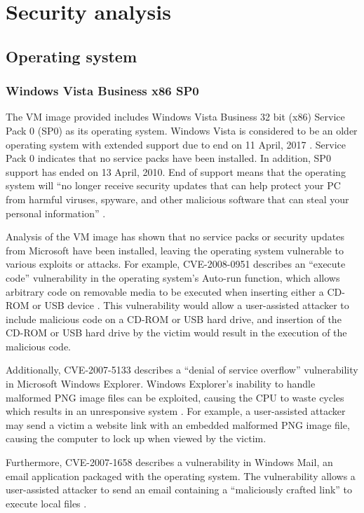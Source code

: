 \section{Security analysis}

\subsection{Operating system}

\subsubsection{Windows Vista Business x86 SP0}

The VM image provided includes Windows Vista Business 32 bit (x86) Service Pack 0 (SP0) as its operating system. Windows Vista is considered to be an older operating system with extended support due to end on 11 April, 2017 \citep{Microsoft2014}. Service Pack 0 indicates that no service packs have been installed. In addition, SP0 support has ended on 13 April, 2010. End of support means that the operating system will ``no longer receive security updates that can help protect your PC from harmful viruses, spyware, and other malicious software that can steal your personal information'' \citep{MicrosoftSupportLifecycle}.

Analysis of the VM image has shown that no service packs or security updates from Microsoft have been installed, leaving the operating system vulnerable to various exploits or attacks. For example, CVE-2008-0951 describes an ``execute code'' vulnerability in the operating system's Auto-run function, which allows arbitrary code on removable media to be executed when inserting either a CD-ROM or USB device \citep{SecurityFocus2008}. This vulnerability would allow a user-assisted attacker to include malicious code on a CD-ROM or USB hard drive, and insertion of the CD-ROM or USB hard drive by the victim would result in the execution of the malicious code.

Additionally, CVE-2007-5133 describes a ``denial of service overflow'' vulnerability in Microsoft Windows Explorer. Windows Explorer's inability to handle malformed PNG image files can be exploited, causing the CPU to waste cycles which results in an unresponsive system \citep{SecurityFocus2007a}. For example, a user-assisted attacker may send a victim a website link with an embedded malformed PNG image file, causing the computer to lock up when viewed by the victim.

Furthermore, CVE-2007-1658 describes a vulnerability in Windows Mail, an email application packaged with the operating system. The vulnerability allows a user-assisted attacker to send an email containing a ``maliciously crafted link'' to execute local files \citep{SecurityFocus2007b}.

